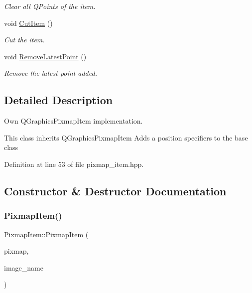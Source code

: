 \begin{DoxyCompactItemize}
\begin{DoxyCompactList}\small\item\em Clear all Q\+Points of the item. \end{DoxyCompactList}\item 
void \mbox{\hyperlink{classPixmapItem_a4a742318dce01d018da2f4b01790c210}{Cut\+Item}} ()
\begin{DoxyCompactList}\small\item\em Cut the item. \end{DoxyCompactList}\item 
void \mbox{\hyperlink{classPixmapItem_ae2e67a7b69ef10dc613e14c1d3c1a327}{Remove\+Latest\+Point}} ()
\begin{DoxyCompactList}\small\item\em Remove the latest point added. \end{DoxyCompactList}\end{DoxyCompactItemize}


\subsection{Detailed Description}
Own Q\+Graphics\+Pixmap\+Item implementation. 

This class inherits Q\+Graphics\+Pixmap\+Item Adds a position specifiers to the base class 

Definition at line 53 of file pixmap\+\_\+item.\+hpp.



\subsection{Constructor \& Destructor Documentation}
\mbox{\label{classPixmapItem_a7e339e581be3c4892d2af89494bd137c}} 
\subsubsection{\texorpdfstring{Pixmap\+Item()}{PixmapItem()}}
{\footnotesize\ttfamily Pixmap\+Item\+::\+Pixmap\+Item (\begin{DoxyParamCaption}\item[{Q\+Pixmap}]{pixmap,  }\item[{Q\+String}]{image\+\_\+name }\end{DoxyParamCaption})}



